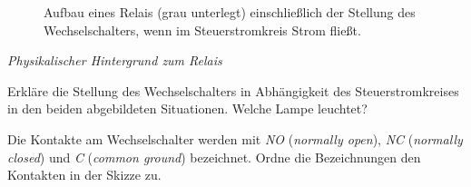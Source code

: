 \begin{minipage}{0.48\textwidth}
\begin{figure}[H]
		\caption{Aufbau eines Relais (grau unterlegt) einschließlich der Stellung des Wechselschalters, wenn im Steuerstromkreis Strom fließt.}
	\end{figure}
\end{minipage}

\bigskip
\begin{aufgabe}\emph{Physikalischer Hintergrund zum Relais}
	
	Erkläre die Stellung des Wechselschalters in Abhängigkeit des Steuerstromkreises in den beiden abgebildeten Situationen. Welche Lampe leuchtet?
	
	Die Kontakte am Wechselschalter werden mit \emph{NO} (\emph{normally open}), \emph{NC} (\emph{normally closed}) und \emph{C} (\emph{common ground}) bezeichnet. Ordne die Bezeichnungen den Kontakten in der Skizze zu.
\end{aufgabe}

